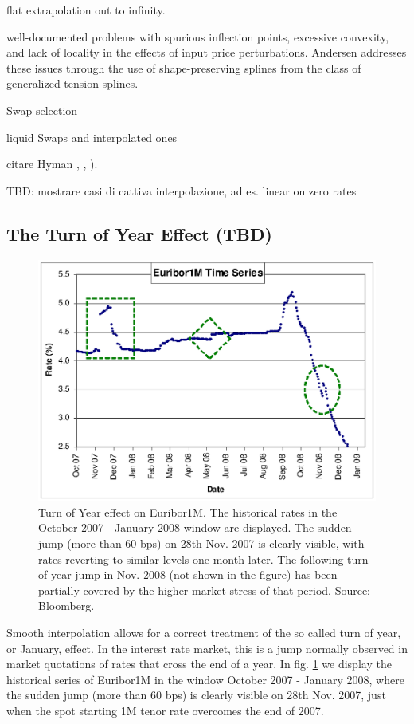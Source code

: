 \documentclass[11pt,reqno]{amsart}
\begin{document}
flat extrapolation out to infinity.

well-documented problems with spurious inflection points, excessive convexity, and lack of locality in the effects of input price perturbations. Andersen \cite{And07} addresses these issues through the use of shape-preserving splines from the class of generalized tension splines.

Swap selection

liquid Swaps and interpolated ones

citare Hyman \cite{Hym1983}, \cite{HagWes06}, \cite{HagWes08}).

TBD: mostrare casi di cattiva interpolazione, ad es. linear on zero rates

\subsection{\label{sec:TOY}The Turn of Year Effect (TBD)}
\begin{figure}[tbp]
\centering
\includegraphics[scale=0.55]{../figures/FigEuribor1M}
\caption{Turn of Year effect on Euribor1M. The historical rates in the October 2007 - January 2008 window are displayed. The sudden jump (more than 60 bps) on 28th Nov. 2007 is clearly visible, with rates reverting to similar levels one month later. The following turn of year jump in Nov. 2008 (not shown in the figure) has been partially covered by the higher market stress of that period. Source: Bloomberg.}
\label{fig:ToY}
\end{figure}
Smooth interpolation allows for a correct treatment of the so called turn of year, or January, effect.
In the interest rate market, this is a jump normally observed in market quotations of rates that cross the end of a year. In fig. \ref{fig:ToY} we display the historical series of Euribor1M in the window October 2007 - January 2008, where the sudden jump (more than 60 bps) is clearly visible on 28th Nov. 2007, just when the spot starting 1M tenor rate overcomes the end of 2007.
\end{document}
